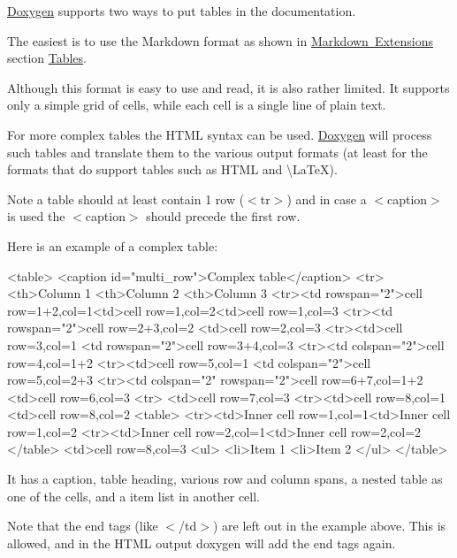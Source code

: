 \mbox{\hyperlink{class_doxygen}{Doxygen}} supports two ways to put tables in the documentation.

The easiest is to use the Markdown format as shown in \mbox{\hyperlink{markdown_markdown_extra}{Markdown Extensions}} section \mbox{\hyperlink{markdown_md_tables}{Tables}}.

Although this format is easy to use and read, it is also rather limited. It supports only a simple grid of cells, while each cell is a single line of plain text.

For more complex tables the H\+T\+ML syntax can be used. \mbox{\hyperlink{class_doxygen}{Doxygen}} will process such tables and translate them to the various output formats (at least for the formats that do support tables such as H\+T\+ML and \textbackslash{}\+La\+TeX).

Note a table should at least contain 1 row ({\ttfamily $<$tr$>$}) and in case a {\ttfamily $<$caption$>$} is used the {\ttfamily $<$caption$>$} should precede the first row.

Here is an example of a complex table\+:

\begin{DoxyVerb}<table>
<caption id="multi_row">Complex table</caption>
<tr><th>Column 1                      <th>Column 2        <th>Column 3
<tr><td rowspan="2">cell row=1+2,col=1<td>cell row=1,col=2<td>cell row=1,col=3
<tr><td rowspan="2">cell row=2+3,col=2                    <td>cell row=2,col=3
<tr><td>cell row=3,col=1                                  <td rowspan="2">cell row=3+4,col=3
<tr><td colspan="2">cell row=4,col=1+2
<tr><td>cell row=5,col=1              <td colspan="2">cell row=5,col=2+3
<tr><td colspan="2" rowspan="2">cell row=6+7,col=1+2      <td>cell row=6,col=3
<tr>                                                      <td>cell row=7,col=3
<tr><td>cell row=8,col=1              <td>cell row=8,col=2\n
  <table>
    <tr><td>Inner cell row=1,col=1<td>Inner cell row=1,col=2
    <tr><td>Inner cell row=2,col=1<td>Inner cell row=2,col=2
  </table>
  <td>cell row=8,col=3
  <ul>
    <li>Item 1
    <li>Item 2
  </ul>
</table>
\end{DoxyVerb}


It has a caption, table heading, various row and column spans, a nested table as one of the cells, and a item list in another cell.

Note that the end tags (like {\ttfamily $<$/td$>$}) are left out in the example above. This is allowed, and in the H\+T\+ML output doxygen will add the end tags again.

